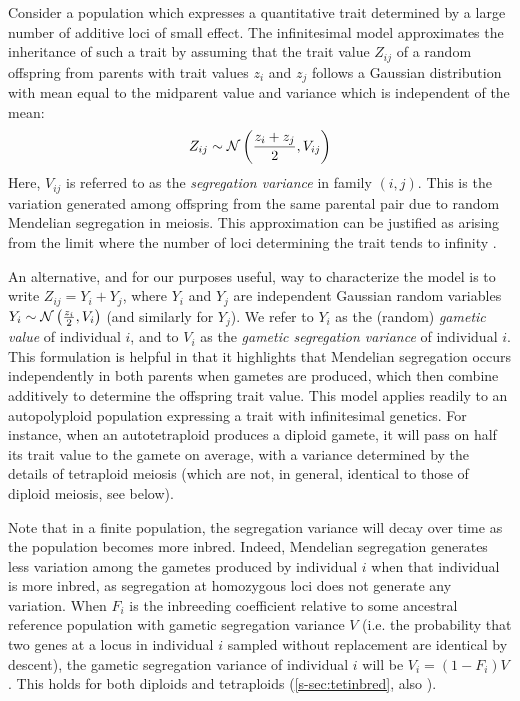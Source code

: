\documentclass[11pt,a4paper]{article}
\begin{document}
Consider a population which expresses a quantitative trait determined by a
large number of additive loci of small effect.
The infinitesimal model approximates the inheritance of such a trait by
assuming that the trait value $Z_{ij}$ of a random offspring from parents with
trait values $z_i$ and $z_j$ follows a Gaussian distribution with mean equal to
the midparent value and variance which is independent of the mean:
  \begin{align}
  Z_{ij} \sim \mathcal{N}\left(\frac{z_i + z_j}{2}, V_{ij}\right)
  \label{eq:inf}
  \end{align}
Here, $V_{ij}$ is referred to as the \textit{segregation variance} in family
$(i,j)$.
This is the variation generated among offspring from the same parental pair due
to random Mendelian segregation in meiosis.
This approximation can be justified as arising from the limit where the number
of loci determining the trait tends to infinity \citep{barton2017}.

An alternative, and for our purposes useful, way to characterize the model
is to write $Z_{ij} = Y_i + Y_j$, where $Y_i$ and $Y_j$
are independent Gaussian random variables $Y_i \sim \mathcal{N}\left(\frac{z_i}{2},
V_i\right)$ (and similarly for $Y_j$).
We refer to $Y_i$ as the (random) \textit{gametic value} of individual $i$, and
to $V_i$ as the \textit{gametic segregation variance} of individual $i$.
This formulation is helpful in that it highlights that Mendelian segregation
occurs independently in both parents when gametes are produced, which then
combine additively to determine the offspring trait value.
This model applies readily to an autopolyploid population expressing a trait
with infinitesimal genetics.
For instance, when an autotetraploid produces a diploid gamete, it will pass on
half its trait value to the gamete on average, with a variance determined by
the details of tetraploid meiosis (which are not, in general, identical to
those of diploid meiosis, see below).

Note that in a finite population, the segregation variance will decay over time
as the population becomes more inbred.
Indeed, Mendelian segregation generates less variation among the gametes
produced by individual $i$ when that individual is more inbred, as segregation
at homozygous loci does not generate any variation.
When $F_i$ is the inbreeding coefficient relative to some ancestral reference
population with gametic segregation variance $V$ (i.e. the probability that two
genes at a locus in individual $i$ sampled without replacement are identical by
descent), the gametic segregation variance of individual $i$ will be
$V_i = (1-F_i)V$.
This holds for both diploids and tetraploids (\cref{s-sec:tetinbred}, also
\cite{moody1993}). 
\end{document}

